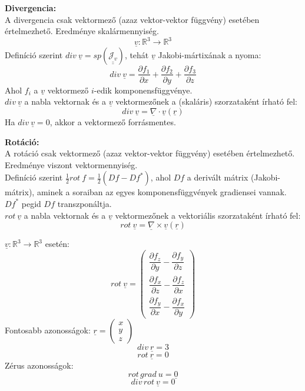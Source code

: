 \documentclass[11pt,a4paper]{article}
\begin{document}
\begin{tcolorbox}[colback=red!5!white,colframe=red!60!black,title= 4. Gradiens{,} divergencia{,} rotáció]
    \textbf{Divergencia:} \\
    A divergencia csak vektormező (azaz vektor-vektor függvény) esetében értelmezhető. Eredménye skalármennyiség.
    $$\underline{v}: \mathbb{R}^3 \rightarrow \mathbb{R}^3 $$
    Definíció szerint $div\ \underline{v} = sp(\underline{\underline{\mathcal{J}_v}})$, tehát $\underline{v}$ Jakobi-mártixának a nyoma:
    $$div\ \underline{v} = \frac{\partial f_1}{\partial x} + \frac{\partial f_2}{\partial y} + \frac{\partial f_3}{\partial z}$$
    Ahol $f_i$ a $\underline{v}$ vektormező $i$-edik komponensfüggvénye. \\
    $div\ \underline{v}$ a nabla vektornak és a $\underline{v}$ vektormezőnek a (skaláris) szorzataként írható fel:
    $$div\ \underline{v} = \underline{\nabla} \cdot \underline{v}(\underline{r})$$
    Ha $div\ \underline{v} = 0$, akkor a vektormező forrásmentes.

    \textbf{Rotáció:} \\
    A rotáció csak vektormező (azaz vektor-vektor függvény) esetében értelmezhető. Eredménye viszont vektormennyiség. \\
    Definíció szerint $\frac{1}{2}rot\ f = \frac{1}{2}(Df-Df^*)$, ahol $Df$ a derivált mátrix (Jakobi-mátrix), aminek a soraiban az egyes komponensfüggvények gradiensei vannak. $Df^*$ pegid $Df$ transzponáltja. \\
    $rot\ \underline{v}$ a nabla vektornak és a $\underline{v}$ vektormezőnek a vektoriális szorzataként írható fel:
    $$rot\ \underline{v} = \underline{\nabla} \times \underline{v}(\underline{r})$$
    \end{tcolorbox}

    \begin{tcolorbox}[colback=red!5!white,colframe=red!60!black,title= 4. Gradiens{,} divergencia{,} rotáció] %
    $\underline{v}: \mathbb{R}^3 \rightarrow \mathbb{R}^3$ esetén:
    $$rot\ \underline{v} = 
    \begin{pmatrix}
        \dfrac{\partial f_z}{\partial y} - \dfrac{\partial f_y}{\partial z}\\[8pt]
        \dfrac{\partial f_x}{\partial z} - \dfrac{\partial f_z}{\partial x}\\[8pt]
        \dfrac{\partial f_y}{\partial x} - \dfrac{\partial f_x}{\partial y}
    \end{pmatrix}$$
    Fontosabb azonosságok: $\underline{r} = \begin{pmatrix} x\\ y\\ z \end{pmatrix}$
    $$div\ \underline{r} = 3$$
    $$rot\ \underline{r} = 0$$
    Zérus azonosságok:
    $$rot\,grad\ u = \underline{0}$$
    $$div\,rot\ \underline{v} = 0$$
    \end{tcolorbox}
\end{document}
